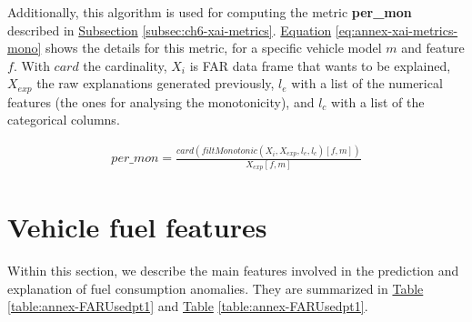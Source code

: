 Additionally, this algorithm is used for computing the metric \textbf{per\_mon} described in \hyperref[subsec:ch6-xai-metrics]{Subsection} \ref{subsec:ch6-xai-metrics}. \hyperref[eq:annex-xai-metrics-mono]{Equation} \ref{eq:annex-xai-metrics-mono} shows the details for this metric, for a specific vehicle model $m$ and feature $f$. With $card$ the cardinality, $X_{i}$ is FAR data frame that wants to be explained, $X_{exp}$ the raw explanations generated previously, $l_e$ with a list of the numerical features (the ones for analysing the monotonicity), and $l_c$ with a list of the categorical columns.

\begin{equation}\label{eq:annex-xai-metrics-mono}
\begin{aligned}
per\_mon = \frac{card(filtMonotonic(X_{i}, X_{exp}, l_e, l_c)[f, m])} {X_{exp}[f, m]}
\end{aligned}
\end{equation}

\newpage
\section{Vehicle fuel features}\label{sec:annex-fuel-features}
Within this section, we describe the main features involved in the prediction and explanation of fuel consumption anomalies. They are summarized in \hyperref[table:annex-FARUsedpt1]{Table} \ref{table:annex-FARUsedpt1} and \hyperref[table:annex-FARUsedpt1]{Table} \ref{table:annex-FARUsedpt1}. 

